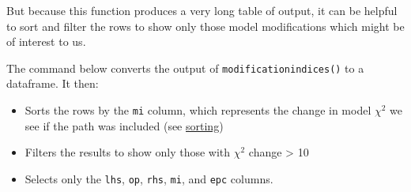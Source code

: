 \documentclass[]{article}
\newenvironment{Shaded}{\begin{snugshade}}{\end{snugshade}}
\newcommand{\DataTypeTok}[1]{\textcolor[rgb]{0.13,0.29,0.53}{#1}}
\newcommand{\DecValTok}[1]{\textcolor[rgb]{0.00,0.00,0.81}{#1}}
\newcommand{\KeywordTok}[1]{\textcolor[rgb]{0.13,0.29,0.53}{\textbf{#1}}}
\newcommand{\NormalTok}[1]{#1}
\newcommand{\OperatorTok}[1]{\textcolor[rgb]{0.81,0.36,0.00}{\textbf{#1}}}
\newcommand{\StringTok}[1]{\textcolor[rgb]{0.31,0.60,0.02}{#1}}
\providecommand{\tightlist}{%
  \setlength{\itemsep}{0pt}\setlength{\parskip}{0pt}}
\begin{document}
But because this function produces a very long table of output, it can be
helpful to sort and filter the rows to show only those model modifications which
might be of interest to us.

The command below converts the output of \texttt{modificationindices()} to a dataframe.
It then:

\begin{itemize}
\tightlist
\item
  Sorts the rows by the \texttt{mi} column, which represents the change in model
  \(\chi^2\) we see if the path was included (see \protect\hyperlink{sorting}{sorting})
\item
  Filters the results to show only those with \(\chi^2\) change \textgreater{} 10
\item
  Selects only the \texttt{lhs}, \texttt{op}, \texttt{rhs}, \texttt{mi}, and \texttt{epc} columns.
\end{itemize}

\begin{Shaded}
\end{Shaded}
\end{document}
